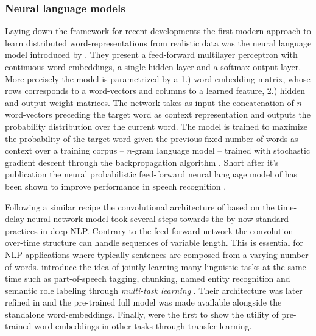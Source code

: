 \subsubsection{Neural language models}
\label{sec:NNLM}
Laying down the framework for recent developments the first modern approach to learn
distributed word-representations from realistic data
was the neural language model introduced by \cite{bengio2003neural}.
They present a feed-forward multilayer perceptron with continuous word-embeddings,
a single hidden layer and a softmax output layer.
More precisely the model is parametrized by a 1.) word-embedding matrix, 
whose rows corresponds to a word-vectors
and columns to a learned feature, 2.)
hidden and output weight-matrices. 
The network takes as input the concatenation of $n$ word-vectors preceding the target word as context
representation and outputs the probability distribution over the current word.
The model is trained to maximize the probability of
the target word given the previous fixed number of words as context over a training corpus
-- $n$-gram language model -- trained with stochastic gradient descent \citep{cauchy1847methode}
through the backpropagation algorithm \citep{rumelhart1985learning}.
Short after it's publication the neural probabilistic feed-forward neural language model of  \cite{bengio2003neural} 
has been shown to improve performance in speech recognition \citep{schwenk2005training}.




Following a similar recipe the convolutional architecture of \cite{collobert2008unified}
based on the time-delay neural network model \citep{waibel1990phoneme} took several steps towards the
by now standard practices in deep NLP.
Contrary to the feed-forward network the convolution over-time structure can handle
sequences of variable length. This is essential for NLP applications where typically sentences
are composed from a varying number of words.
\cite{collobert2008unified} introduce the idea of jointly learning many linguistic tasks at the same time such as part-of-speech
tagging, chunking, named entity recognition and semantic role labeling through \emph{multi-task learning} 
\citep{caruana1997multitask}.
Their architecture was later refined in \cite{collobert2011natural} and the pre-trained
full model was made available alongside the standalone word-embeddings.
Finally, \cite{collobert2008unified} were the first to show the utility of pre-trained word-embeddings
in other tasks through transfer learning.

